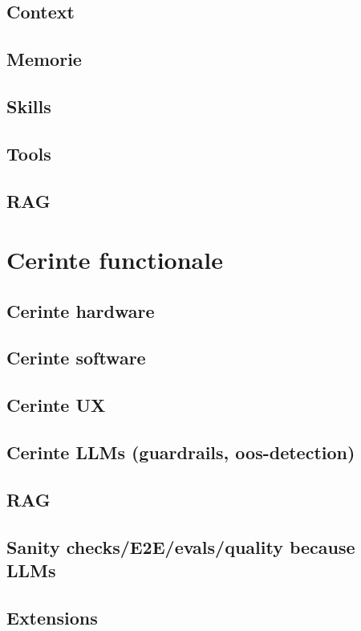 \documentclass[12pt, a4paper, oneside, romanian, draft]{teza-upb}
\begin{document}
    \subsection{Context}
    \subsection{Memorie}
    \subsection{Skills}
    \subsection{Tools}
    \subsection{RAG}

  \section{Cerinte functionale}
    \subsection{Cerinte hardware}
    \subsection{Cerinte software}
    \subsection{Cerinte UX}
    \subsection{Cerinte LLMs (guardrails, oos-detection)}
    \subsection{RAG}
    \subsection{Sanity checks/E2E/evals/quality because LLMs}
    \subsection{Extensions}
    
\end{document}
